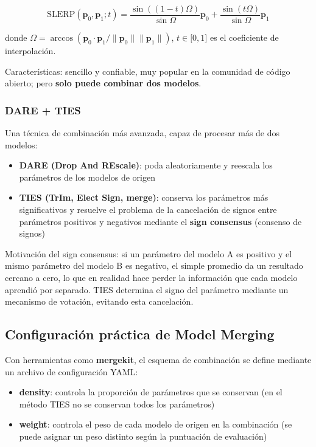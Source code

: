 $$\text{SLERP}(\mathbf{p}_0, \mathbf{p}_1; t) = \frac{\sin((1-t)\Omega)}{\sin\Omega}\mathbf{p}_0 + \frac{\sin(t\Omega)}{\sin\Omega}\mathbf{p}_1$$

donde $\Omega = \arccos(\mathbf{p}_0 \cdot \mathbf{p}_1 / \|\mathbf{p}_0\| \|\mathbf{p}_1\|)$, $t \in {[}0, 1{]}$ es el coeficiente de interpolación.

Características: sencillo y confiable, muy popular en la comunidad de código abierto; pero \textbf{solo puede combinar dos modelos}.

\subsubsection{DARE + TIES}

Una técnica de combinación más avanzada, capaz de procesar más de dos modelos:

\begin{itemize}
    \item \textbf{DARE (Drop And REscale)}: poda aleatoriamente y reescala los parámetros de los modelos de origen
    \item \textbf{TIES (TrIm, Elect Sign, merge)}: conserva los parámetros más significativos y resuelve el problema de la cancelación de signos entre parámetros positivos y negativos mediante el \textbf{sign consensus} (consenso de signos)
\end{itemize}

Motivación del sign consensus: si un parámetro del modelo A es positivo y el mismo parámetro del modelo B es negativo, el simple promedio da un resultado cercano a cero, lo que en realidad hace perder la información que cada modelo aprendió por separado. TIES determina el signo del parámetro mediante un mecanismo de votación, evitando esta cancelación.

\subsection{Configuración práctica de Model Merging}

Con herramientas como \textbf{mergekit}, el esquema de combinación se define mediante un archivo de configuración YAML:

\begin{itemize}
    \item \textbf{density}: controla la proporción de parámetros que se conservan (en el método TIES no se conservan todos los parámetros)
    \item \textbf{weight}: controla el peso de cada modelo de origen en la combinación (se puede asignar un peso distinto según la puntuación de evaluación)
\end{itemize}

